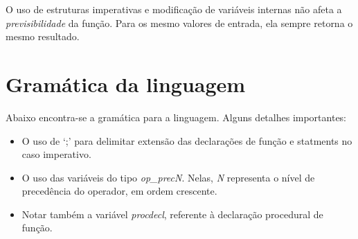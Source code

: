 \documentclass[11pt]{article}
\begin{document}
O uso de estruturas imperativas e modificação de variáveis 
internas não afeta a 
\emph{previsibilidade} da função. Para os mesmo valores de 
entrada, ela sempre retorna o mesmo 
resultado.

\section{Gramática da linguagem}

Abaixo encontra-se a gramática para a linguagem. Alguns detalhes importantes:
\begin{itemize}[leftmargin=.5in]
\item O uso de `;' para delimitar extensão das declarações de
função e statments no caso imperativo. 
\item O uso das variáveis 
do tipo \emph{op\_precN}. Nelas, \emph{N} representa o nível de 
precedência do operador, em ordem crescente. 
\item Notar também a variável \emph{procdecl}, referente à declaração procedural de função.
\end{itemize}
\end{document}
